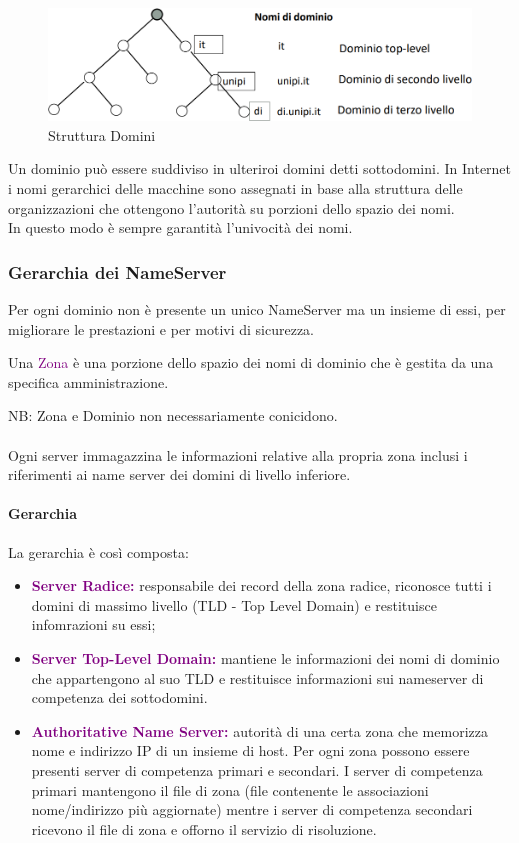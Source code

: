 \begin{figure}[h]
    \centering
    \includegraphics[scale=0.45]{Immagini/StrutturaNomiDiDominio.png}
    \caption{Struttura Domini}
\end{figure}

Un dominio può essere suddiviso in ulteriroi domini detti sottodomini.
In Internet i nomi gerarchici delle macchine sono assegnati in base alla struttura delle organizzazioni che ottengono l'autorità su porzioni dello spazio dei nomi.
\\In questo modo è sempre garantità l'univocità dei nomi.

\subsubsection{Gerarchia dei NameServer}
Per ogni dominio non è presente un unico NameServer ma un insieme di essi, per migliorare le prestazioni e per motivi di sicurezza.
\begin{definition}[Zona]
    Una \textcolor{purple}{Zona} è una porzione dello spazio dei nomi di dominio che è gestita da una specifica amministrazione.
\end{definition} 
NB: Zona e Dominio non necessariamente conicidono.
\\\\Ogni server immagazzina le informazioni relative alla propria zona inclusi i riferimenti ai name server dei domini di livello inferiore.

\paragraph{Gerarchia} La gerarchia è così composta:
\begin{itemize}
    \item \textbf{\textcolor{purple}{Server Radice:}} responsabile dei record della zona radice, riconosce tutti i domini di massimo livello (TLD - Top Level Domain) e restituisce infomrazioni su essi;
    \item \textbf{\textcolor{purple}{Server Top-Level Domain:}} mantiene le informazioni dei nomi di dominio che appartengono al suo TLD e restituisce informazioni sui nameserver di competenza dei sottodomini.
    \item \textbf{\textcolor{purple}{Authoritative Name Server:}} autorità di una certa zona che memorizza nome e indirizzo IP di un insieme di host. Per ogni zona possono essere presenti server di competenza primari e secondari. I server di competenza primari mantengono il file di zona (file contenente le associazioni nome/indirizzo più aggiornate) mentre i server di competenza secondari ricevono il file di zona e offorno il servizio di risoluzione.
\end{itemize}


